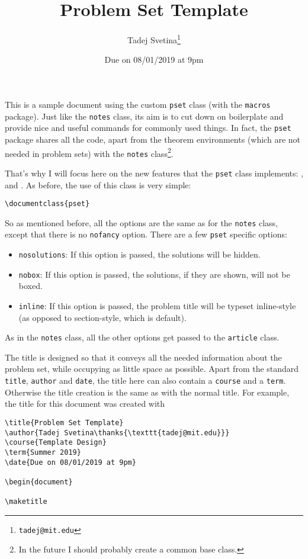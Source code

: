 \documentclass[letterpaper,11pt]{pset}
\title{Problem Set Template}
\author{Tadej Svetina\thanks{\texttt{tadej@mit.edu}}}
\date{Due on 08/01/2019 at 9pm}
\theoremstyle{remark}
\begin{document}
\maketitle

This is a sample document using the custom \texttt{pset} class (with the \texttt{macros} package). Just like the \texttt{notes} class, its aim is to cut down on boilerplate and provide nice and useful commands for commonly used things. In fact, the \texttt{pset} package shares all the code, apart from the theorem environments (which are not needed in problem sets) with the \texttt{notes} class\footnote{In the future I should probably create a common base class.}. 

That's why I will focus here on the new features that the \texttt{pset} class implements: ,  and . As before, the use of this class is very simple:
\begin{verbatim}
\documentclass{pset}
\end{verbatim}

So as mentioned before, all the options are the same as for the \texttt{notes} class, except that there is no \texttt{nofancy} option. There are a few \texttt{pset} specific options:
\begin{itemize}
    \item \texttt{nosolutions}: If this option is passed, the solutions will be hidden.
    \item \texttt{nobox}: If this option is passed, the solutions, if they are shown, will not be boxed.
    \item \texttt{inline}: If this option is passed, the problem title will be typeset inline-style (as opposed to section-style, which is default).
\end{itemize}
As in the \texttt{notes} class, all the other options get passed to the \texttt{article} class.

The title is designed so that it conveys all the needed information about the problem set, while occupying as little space as possible. Apart from the standard \texttt{title}, \texttt{author} and \texttt{date}, the title here can also contain a \texttt{course} and a \texttt{term}. Otherwise the title creation is the same as with the normal title. For example, the title for this document was created with

\begin{verbatim}
\title{Problem Set Template}
\author{Tadej Svetina\thanks{\texttt{tadej@mit.edu}}}
\course{Template Design}
\term{Summer 2019}
\date{Due on 08/01/2019 at 9pm}

\begin{document}

\maketitle
\end{verbatim}
\end{document}
